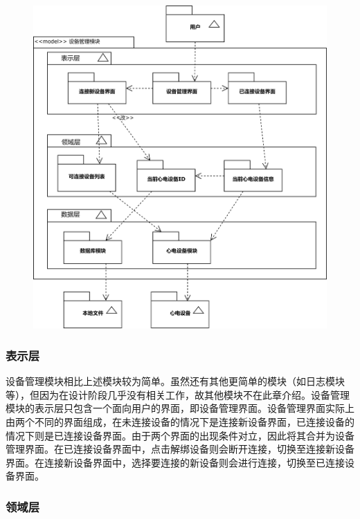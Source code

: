 \begin{figure}[!ht]
    \includegraphics[width=\textwidth]{../assets/model-device.drawio}
    \label{fig:model-device}
\end{figure}

\subsubsection{表示层}

设备管理模块相比上述模块较为简单。虽然还有其他更简单的模块（如日志模块等），但因为在设计阶段几乎没有相关工作，故其他模块不在此章介绍。设备管理模块的表示层只包含一个面向用户的界面，即设备管理界面。设备管理界面实际上由两个不同的界面组成，在未连接设备的情况下是连接新设备界面，已连接设备的情况下则是已连接设备界面。由于两个界面的出现条件对立，因此将其合并为设备管理界面。在已连接设备界面中，点击解绑设备则会断开连接，切换至连接新设备界面。在连接新设备界面中，选择要连接的新设备则会进行连接，切换至已连接设备界面。

\subsubsection{领域层}

